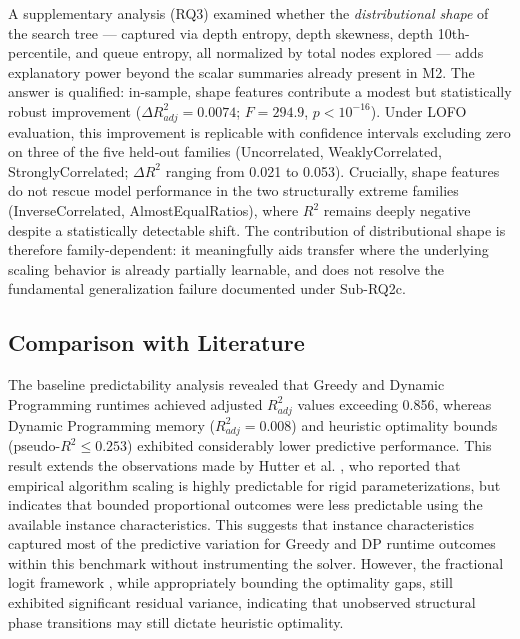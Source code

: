 \documentclass[11pt,a4paper]{article}
\begin{document}
A supplementary analysis (RQ3) examined whether the \emph{distributional shape} of the search tree --- captured via depth entropy, depth skewness, depth 10th-percentile, and queue entropy, all normalized by total nodes explored --- adds explanatory power beyond the scalar summaries already present in M2. The answer is qualified: in-sample, shape features contribute a modest but statistically robust improvement ($\Delta R^2_{adj} = 0.0074$; $F = 294.9$, $p < 10^{-16}$). Under LOFO evaluation, this improvement is replicable with confidence intervals excluding zero on three of the five held-out families (Uncorrelated, WeaklyCorrelated, StronglyCorrelated; $\Delta R^2$ ranging from 0.021 to 0.053). Crucially, shape features do not rescue model performance in the two structurally extreme families (InverseCorrelated, AlmostEqualRatios), where $R^2$ remains deeply negative despite a statistically detectable shift. The contribution of distributional shape is therefore family-dependent: it meaningfully aids transfer where the underlying scaling behavior is already partially learnable, and does not resolve the fundamental generalization failure documented under Sub-RQ2c.

\subsection{Comparison with Literature}
The baseline predictability analysis revealed that Greedy and Dynamic Programming runtimes achieved adjusted $R^2_{adj}$ values exceeding 0.856, whereas Dynamic Programming memory ($R^2_{adj} = 0.008$) and heuristic optimality bounds (pseudo-$R^2 \le 0.253$) exhibited considerably lower predictive performance. This result extends the observations made by Hutter et al. \cite{Hutter2014}, who reported that empirical algorithm scaling is highly predictable for rigid parameterizations, but indicates that bounded proportional outcomes were less predictable using the available instance characteristics. This suggests that instance characteristics captured most of the predictive variation for Greedy and DP runtime outcomes within this benchmark without instrumenting the solver. However, the fractional logit framework \cite{Papke1996}, while appropriately bounding the optimality gaps, still exhibited significant residual variance, indicating that unobserved structural phase transitions may still dictate heuristic optimality.
\end{document}
